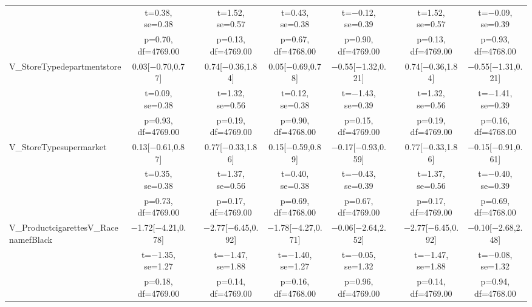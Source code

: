 \documentclass[]{report}
\begin{document}
\begin{table}
{\begin{tabular}[t]{lcccccccc}
		& t=\num{0.38}, se=\num{0.38} &  & t=\num{1.52}, se=\num{0.57} & t=\num{0.43}, se=\num{0.38} & t=\num{-0.12}, se=\num{0.39} &  & t=\num{1.52}, se=\num{0.57} & t=\num{-0.09}, se=\num{0.39}\\
		& p=\num{0.70}, df=\num{4769.00} &  & p=\num{0.13}, df=\num{4769.00} & p=\num{0.67}, df=\num{4768.00} & p=\num{0.90}, df=\num{4769.00} &  & p=\num{0.13}, df=\num{4769.00} & p=\num{0.93}, df=\num{4768.00}\\
		V\_StoreTypedepartmentstore & \num{0.03}[\num{-0.70},\num{0.77}] &  & \num{0.74}[\num{-0.36},\num{1.84}] & \num{0.05}[\num{-0.69},\num{0.78}] & \num{-0.55}[\num{-1.32},\num{0.21}] &  & \num{0.74}[\num{-0.36},\num{1.84}] & \num{-0.55}[\num{-1.31},\num{0.21}]\\
		& t=\num{0.09}, se=\num{0.38} &  & t=\num{1.32}, se=\num{0.56} & t=\num{0.12}, se=\num{0.38} & t=\num{-1.43}, se=\num{0.39} &  & t=\num{1.32}, se=\num{0.56} & t=\num{-1.41}, se=\num{0.39}\\
		& p=\num{0.93}, df=\num{4769.00} &  & p=\num{0.19}, df=\num{4769.00} & p=\num{0.90}, df=\num{4768.00} & p=\num{0.15}, df=\num{4769.00} &  & p=\num{0.19}, df=\num{4769.00} & p=\num{0.16}, df=\num{4768.00}\\
		V\_StoreTypesupermarket & \num{0.13}[\num{-0.61},\num{0.87}] &  & \num{0.77}[\num{-0.33},\num{1.86}] & \num{0.15}[\num{-0.59},\num{0.89}] & \num{-0.17}[\num{-0.93},\num{0.59}] &  & \num{0.77}[\num{-0.33},\num{1.86}] & \num{-0.15}[\num{-0.91},\num{0.61}]\\
		& t=\num{0.35}, se=\num{0.38} &  & t=\num{1.37}, se=\num{0.56} & t=\num{0.40}, se=\num{0.38} & t=\num{-0.43}, se=\num{0.39} &  & t=\num{1.37}, se=\num{0.56} & t=\num{-0.40}, se=\num{0.39}\\
		& p=\num{0.73}, df=\num{4769.00} &  & p=\num{0.17}, df=\num{4769.00} & p=\num{0.69}, df=\num{4768.00} & p=\num{0.67}, df=\num{4769.00} &  & p=\num{0.17}, df=\num{4769.00} & p=\num{0.69}, df=\num{4768.00}\\
		V\_ProductcigarettesV\_RacenamefBlack & \num{-1.72}[\num{-4.21},\num{0.78}] &  & \num{-2.77}[\num{-6.45},\num{0.92}] & \num{-1.78}[\num{-4.27},\num{0.71}] & \num{-0.06}[\num{-2.64},\num{2.52}] &  & \num{-2.77}[\num{-6.45},\num{0.92}] & \num{-0.10}[\num{-2.68},\num{2.48}]\\
		& t=\num{-1.35}, se=\num{1.27} &  & t=\num{-1.47}, se=\num{1.88} & t=\num{-1.40}, se=\num{1.27} & t=\num{-0.05}, se=\num{1.32} &  & t=\num{-1.47}, se=\num{1.88} & t=\num{-0.08}, se=\num{1.32}\\
		& p=\num{0.18}, df=\num{4769.00} &  & p=\num{0.14}, df=\num{4769.00} & p=\num{0.16}, df=\num{4768.00} & p=\num{0.96}, df=\num{4769.00} &  & p=\num{0.14}, df=\num{4769.00} & p=\num{0.94}, df=\num{4768.00}\\

\end{tabular}}
\end{table}
\end{document}
